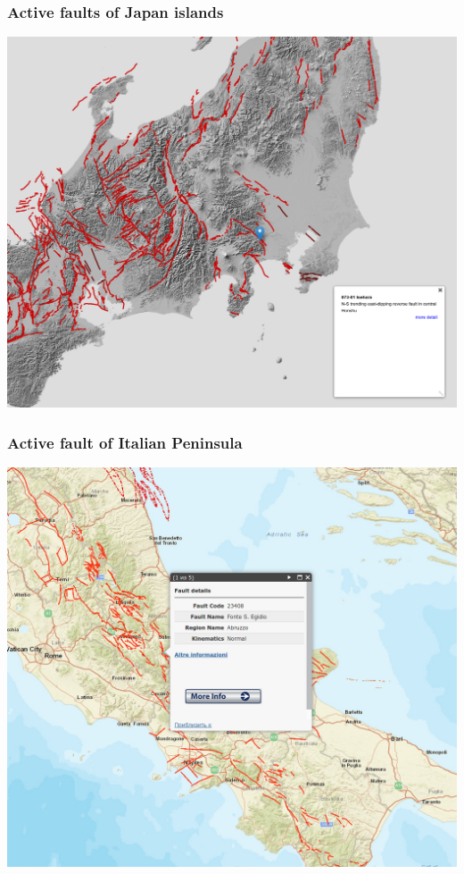 \documentclass[10pt]{beamer}
\begin{document}
\begin{frame}
  \frametitle{Active faults of Japan islands}
  \centering
  \includegraphics[width=\linewidth]{japan.png}
\end{frame}

\begin{frame}
  \frametitle{Active fault of Italian Peninsula}
  \centering
  \includegraphics[width=\linewidth]{italy-1.png}
\end{frame}
\end{document}

